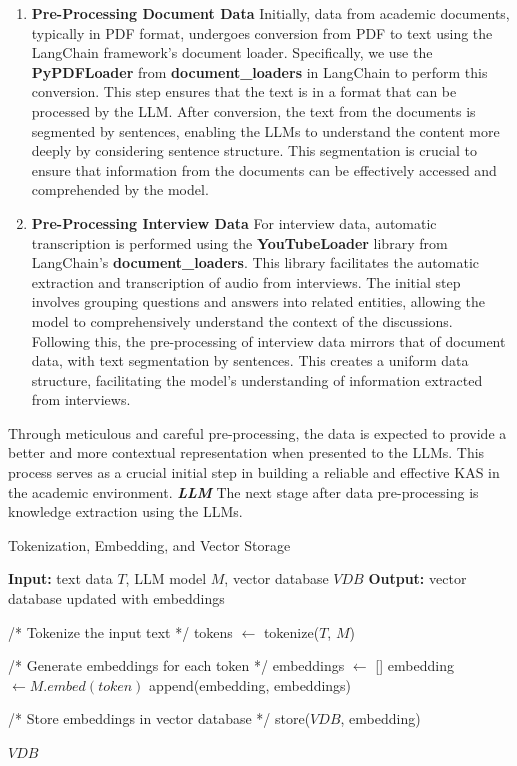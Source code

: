 \documentclass[runningheads]{llncs}
\begin{document}
\begin{enumerate}
    \item \textbf{Pre-Processing Document Data}
    Initially, data from academic documents, typically in PDF format, undergoes conversion from PDF to text using the LangChain framework's document loader. Specifically, we use the \textbf{PyPDFLoader} from \textbf{document\_loaders} in LangChain to perform this conversion. This step ensures that the text is in a format that can be processed by the LLM. After conversion, the text from the documents is segmented by sentences, enabling the LLMs to understand the content more deeply by considering sentence structure. This segmentation is crucial to ensure that information from the documents can be effectively accessed and comprehended by the model.
    
    \item \textbf{Pre-Processing Interview Data} For interview data, automatic transcription is performed using the \textbf{YouTubeLoader} library from LangChain's  \textbf{document\_loaders}. This library facilitates the automatic extraction and transcription of audio from interviews. The initial step involves grouping questions and answers into related entities, allowing the model to comprehensively understand the context of the discussions. Following this, the pre-processing of interview data mirrors that of document data, with text segmentation by sentences. This creates a uniform data structure, facilitating the model's understanding of information extracted from interviews.
\end{enumerate}

Through meticulous and careful pre-processing, the data is expected to provide a better and more contextual representation when presented to the LLMs. This process serves as a crucial initial step in building a reliable and effective KAS in the academic environment.
\newpage
\textbf{\textit{LLM}} The next stage after data pre-processing is knowledge extraction using the LLMs.

\begin{algorithm}
    \caption{Tokenization, Embedding, and Vector Storage}
    \label{algo:llm}
    \begin{algorithmic}[1]
    \State \textbf{Input:} text data $T$, LLM model $M$, vector database $VDB$
    \State \textbf{Output:} vector database updated with embeddings
    
    \State /* Tokenize the input text */
    \State tokens $\gets$ tokenize($T$, $M$)
    
    \State /* Generate embeddings for each token */
    \State embeddings $\gets$ []
        \State embedding $\gets M.embed(token)$
        \State append(embedding, embeddings)
    \EndFor
    
    \State /* Store embeddings in vector database */
        \State store($VDB$, embedding)
    \EndFor
    
    \State \Return $VDB$
    \end{algorithmic}
\end{algorithm}
\end{document}
